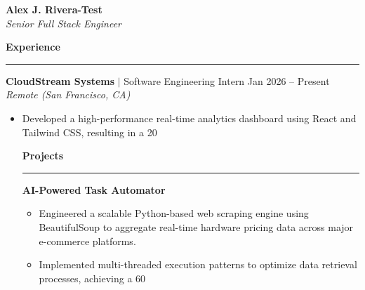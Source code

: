 \documentclass[10pt, letterpaper]{article}
\begin{document}
\begin{minipage}[t]{0.64\textwidth}
    \vspace{-10mm} 
    {\Huge \textbf{\color{accentColor}Alex J. Rivera-Test}} \\
    {\large \textit{Senior Full Stack Engineer}}
    
    \vspace{8mm}
    {\Large \textbf{Experience}}
    \vspace{1mm}
    {\color{lineColor}\hrule}
    \vspace{3mm}
    
            \noindent \textbf{CloudStream Systems} $|$ Software Engineering Intern \hfill \small Jan 2026 -- Present \\
        \textit{\small Remote (San Francisco, CA)} \\
        \vspace{-2mm} %
        {\small \begin{itemize} \item Developed a high-performance real-time analytics dashboard using React and Tailwind CSS, resulting in a 20%
        
    \vspace{2mm}
    {\Large \textbf{Projects}}
    \vspace{1mm}
    {\color{lineColor}\hrule}
    \vspace{3mm}
    
            \noindent \textbf{AI-Powered Task Automator} \\
        \vspace{-2mm} %
        {\small \begin{itemize} \item Engineered a scalable Python-based web scraping engine using BeautifulSoup to aggregate real-time hardware pricing data across major e-commerce platforms. \item Implemented multi-threaded execution patterns to optimize data retrieval processes, achieving a 60%
    

\end{itemize}}
\end{itemize}}
\end{minipage}
\end{document}
